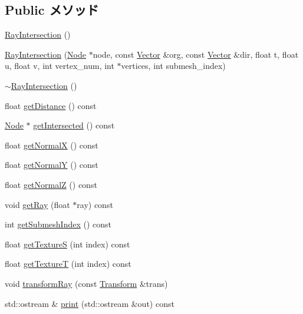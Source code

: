 \subsection*{Public メソッド}
\begin{CompactItemize}
\item 
\hyperlink{classm3g_1_1RayIntersection_242b33a79f98ed90ad5a36912d2a46d5}{RayIntersection} ()
\item 
\hyperlink{classm3g_1_1RayIntersection_c7d946885706d0cefed30d9ee257a771}{RayIntersection} (\hyperlink{classm3g_1_1Node}{Node} $\ast$node, const \hyperlink{classm3g_1_1Vector}{Vector} \&org, const \hyperlink{classm3g_1_1Vector}{Vector} \&dir, float t, float u, float v, int vertex\_\-num, int $\ast$vertices, int submesh\_\-index)
\item 
\hyperlink{classm3g_1_1RayIntersection_bf9eb45cc9ff31acd542bb0da1b46fe1}{$\sim$RayIntersection} ()
\item 
float \hyperlink{classm3g_1_1RayIntersection_f024301f51d2ef67cac50e3255a49612}{getDistance} () const 
\item 
\hyperlink{classm3g_1_1Node}{Node} $\ast$ \hyperlink{classm3g_1_1RayIntersection_cbf90cea6001c33cc03b5a737b312f62}{getIntersected} () const 
\item 
float \hyperlink{classm3g_1_1RayIntersection_0ee7a8fab5e001b131bd3109da8af7fa}{getNormalX} () const 
\item 
float \hyperlink{classm3g_1_1RayIntersection_1e05e3b3e8d6b46462812e4713a63d18}{getNormalY} () const 
\item 
float \hyperlink{classm3g_1_1RayIntersection_5d0569741397401f53b776f16d08f5c3}{getNormalZ} () const 
\item 
void \hyperlink{classm3g_1_1RayIntersection_3f4d1f2f24c0dadab914014836e1b138}{getRay} (float $\ast$ray) const 
\item 
int \hyperlink{classm3g_1_1RayIntersection_6a11c61d1a1fecc01f2f83463404a6b8}{getSubmeshIndex} () const 
\item 
float \hyperlink{classm3g_1_1RayIntersection_bc14e1d5a83d5fca608b1fbf772614d4}{getTextureS} (int index) const 
\item 
float \hyperlink{classm3g_1_1RayIntersection_843d5b907bb54a6f28571f0a0f14c932}{getTextureT} (int index) const 
\item 
void \hyperlink{classm3g_1_1RayIntersection_ee558b3e4c2a54d66f2bb47e3dea6188}{transformRay} (const \hyperlink{classm3g_1_1Transform}{Transform} \&trans)
\item 
std::ostream \& \hyperlink{classm3g_1_1RayIntersection_6fea17fa1532df3794f8cb39cb4f911f}{print} (std::ostream \&out) const 
\end{CompactItemize}



